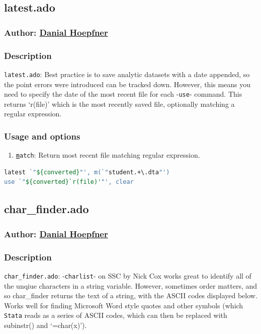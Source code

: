 {\subsection{latest.ado}
\subsubsection{Author: \href{mailto:dhoepfner@gibsonconsult.com}{Danial Hoepfner}}
\subsubsection{Description}
\texttt{latest.ado}: Best practice is to save analytic datasets with a date appended, so the point errors were introduced can be tracked down. However, this means you need to specify the date of the most recent file for each -\texttt{use}- command. This returns `r(file)' which is the most recently saved file, optionally matching a regular expression.
\subsubsection{Usage and options}
\begin{enumerate}
\item \texttt{\underline{m}atch}: Return most recent file matching regular expression.
\end{enumerate}

\begin{lstlisting}[language=Stata, numbers=none]
latest `"${converted}"', m(`"student.+\.dta"')
use `"${converted}`r(file)'"', clear
\end{lstlisting}


\subsection{char\_finder.ado}
\subsubsection{Author: \href{mailto:dhoepfner@gibsonconsult.com}{Danial Hoepfner}}
\subsubsection{Description}
\texttt{char\_finder.ado}: -\texttt{charlist}- on SSC by Nick Cox works great to identify all of the unqiue characters in a string variable. However, sometimes order matters, and so char\_finder returns the text of a string, with the ASCII codes displayed below. Works well for finding Microsoft Word style quotes and other symbols (which \texttt{Stata} reads as a series of ASCII codes, which can then be replaced with subinstr() and `=char(x)').
}
